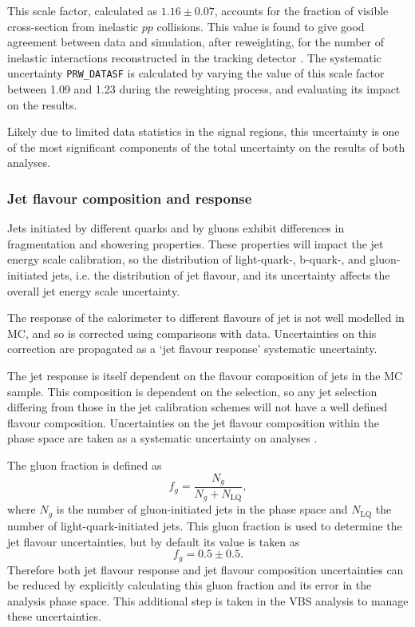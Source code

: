 This scale factor, calculated as $1.16 \pm 0.07$, accounts for the fraction of visible
cross-section from inelastic $pp$ collisions. This value is found to give good
agreement between data and simulation, after reweighting, for the number of
inelastic interactions reconstructed in the tracking detector
\cite{ATLASpileupjets2017}.
The systematic uncertainty \verb|PRW_DATASF| is calculated by varying the value
of this scale factor between 1.09 and 1.23 during the reweighting process, and
evaluating its impact on the results.

Likely due to limited data statistics in the signal regions, this uncertainty is one
of the most significant components of the total uncertainty on the results of both
analyses.

\subsubsection{Jet flavour composition and response}
\label{sec:methods-systematics-jet-flavour}

Jets initiated by different quarks and by gluons exhibit differences in
fragmentation and showering properties. These properties will impact the jet
energy scale calibration, so the distribution of light-quark-, b-quark-,
and gluon-initiated jets, i.e. the distribution of jet flavour, and
its uncertainty affects the overall jet energy scale uncertainty.

The response of the calorimeter to different flavours of jet is not well
modelled in \ac{MC}, and so is corrected using comparisons with data.
Uncertainties on this correction are propagated as a `jet flavour response'
systematic uncertainty.

The jet response is itself dependent on the flavour composition of jets in the
\ac{MC} sample. This composition is dependent on the selection, so any jet
selection differing from those in the jet calibration schemes will not have a
well defined flavour composition. Uncertainties on the jet flavour composition
within the phase space are taken as a systematic uncertainty on analyses
\cite{JetFlavourUncerts2011}.

The gluon fraction is defined as
\begin{equation}
  f_g = \frac{N_g}{N_g + N_\text{LQ}},
  \label{eqn:methods-systematics-fgluon}
\end{equation}
where $N_g$ is the number of gluon-initiated jets in the phase space and
$N_\text{LQ}$ the number of light-quark-initiated jets.
This gluon fraction is used to determine the jet flavour uncertainties, but by
default its value is taken as
\begin{equation*}
  f_g = 0.5 \pm 0.5.
\end{equation*}
Therefore both jet flavour response and jet flavour composition uncertainties
can be reduced by explicitly calculating this gluon fraction and its error in
the analysis phase space. This additional step is taken in the \ac{VBS} analysis
to manage these uncertainties.

